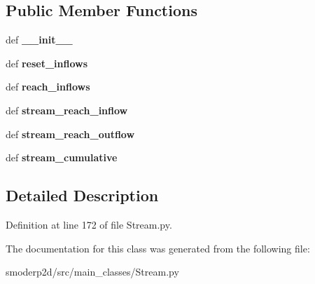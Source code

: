\subsection*{Public Member Functions}
\begin{DoxyCompactItemize}
\item 
\hypertarget{classsmoderp2d_1_1src_1_1main__classes_1_1Stream_1_1StreamPass_a104c4216b1d7131b0eab1f8c16918b79}{def {\bfseries \-\_\-\-\_\-init\-\_\-\-\_\-}}\label{classsmoderp2d_1_1src_1_1main__classes_1_1Stream_1_1StreamPass_a104c4216b1d7131b0eab1f8c16918b79}

\item 
\hypertarget{classsmoderp2d_1_1src_1_1main__classes_1_1Stream_1_1StreamPass_a79fe170e436e449eb6741ad7de78d4fe}{def {\bfseries reset\-\_\-inflows}}\label{classsmoderp2d_1_1src_1_1main__classes_1_1Stream_1_1StreamPass_a79fe170e436e449eb6741ad7de78d4fe}

\item 
\hypertarget{classsmoderp2d_1_1src_1_1main__classes_1_1Stream_1_1StreamPass_a6a3307d529c06df9d0be7d08d663fcac}{def {\bfseries reach\-\_\-inflows}}\label{classsmoderp2d_1_1src_1_1main__classes_1_1Stream_1_1StreamPass_a6a3307d529c06df9d0be7d08d663fcac}

\item 
\hypertarget{classsmoderp2d_1_1src_1_1main__classes_1_1Stream_1_1StreamPass_ab936214091b6251d511615d6144db0b2}{def {\bfseries stream\-\_\-reach\-\_\-inflow}}\label{classsmoderp2d_1_1src_1_1main__classes_1_1Stream_1_1StreamPass_ab936214091b6251d511615d6144db0b2}

\item 
\hypertarget{classsmoderp2d_1_1src_1_1main__classes_1_1Stream_1_1StreamPass_a15968039ec33a1f47b908f2cb0357524}{def {\bfseries stream\-\_\-reach\-\_\-outflow}}\label{classsmoderp2d_1_1src_1_1main__classes_1_1Stream_1_1StreamPass_a15968039ec33a1f47b908f2cb0357524}

\item 
\hypertarget{classsmoderp2d_1_1src_1_1main__classes_1_1Stream_1_1StreamPass_a1a2803c1bd7824c0fcf3d356690d2d29}{def {\bfseries stream\-\_\-cumulative}}\label{classsmoderp2d_1_1src_1_1main__classes_1_1Stream_1_1StreamPass_a1a2803c1bd7824c0fcf3d356690d2d29}

\end{DoxyCompactItemize}


\subsection{Detailed Description}


Definition at line 172 of file Stream.\-py.



The documentation for this class was generated from the following file\-:\begin{DoxyCompactItemize}
\item 
smoderp2d/src/main\-\_\-classes/Stream.\-py\end{DoxyCompactItemize}
